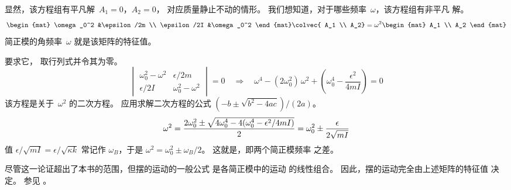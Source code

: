 显然，该方程组有平凡解~$A_1=0$，$A_2=0$，
对应质量静止不动的情形。
我们想知道，对于哪些频率~$\omega$，该方程组有非平凡
解。
\begin{equation*}
  \begin{mat}
    \omega_0^2    &\epsilon/2m  \\
    \epsilon/2I &\omega_0^2
  \end{mat}
  \colvec{
    A_1 \\
    A_2}
  =
  \omega^2
  \begin{mat}
    A_1 \\
    A_2
  \end{mat}
\end{equation*}
简正模的角频率~$\omega$ 就是该矩阵的特征值。

要求它，
取行列式并令其为零。
\begin{equation*}
  \begin{vmatrix}
    \omega_0^2-\omega^2    &\epsilon/2m  \\
    \epsilon/2I &\omega_0^2-\omega^2
  \end{vmatrix}=0 \quad\Longrightarrow\quad
  \omega^4-(2\omega_0^2)\,\omega^2 +(\omega_0^4
  -\frac{\epsilon^2}{4mI})=0
\end{equation*}
该方程是关于~$\omega^2$ 的二次方程。
应用求解二次方程的公式 $(-b\pm\sqrt{b^2-4ac})/(2a)$。
\begin{equation*}   %
  \omega^2 
  =\frac{2\omega_0^2
    \pm\sqrt{\smash[b]{\strut} 4\omega_0^4
      -4(\omega_0^4-\epsilon^2/4mI)}}{2}
  =\omega_0^2\pm\frac{\epsilon}{2\sqrt{mI}}
\end{equation*}
值 $\epsilon/\sqrt{mI}=\epsilon/\sqrt{\kappa k}$ 常记作
$\omega_B$，于是
$
\omega^2 =\omega_0^2\pm\omega_B/2
$。
这就是，即两个简正模频率
之差。

尽管这一论证超出了本书的范围，但摆的运动的一般公式
是各简正模中的运动
的线性组合。
因此，摆的运动完全由上述矩阵的特征值
决定。
参见 \cite{BergMarshall}。

